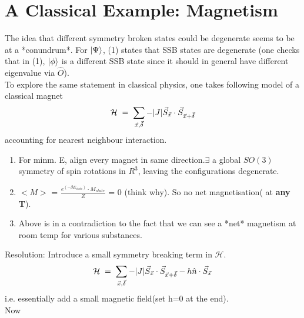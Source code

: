 \documentclass[12pt]{article}
\begin{document}
\section{A Classical Example: Magnetism}
The idea that different symmetry broken states could be degenerate seems to be at a *conundrum*. For $\ket{\Psi}$, (1) states that SSB states are degenerate (one checks that in (1), $\ket{\phi}$ is a different SSB state since it should in general have different eigenvalue via $\hat{O}$).\\
To explore the same statement in classical physics, one takes following model of a classical magnet
\begin{align}
    \mathcal{H}\;=\;\sum_{\Vec{x},\Vec{\delta}} - \abs{J} \Vec{S}_{\Vec{x}}\cdot\Vec{S}_{\Vec{x }+\Vec{\delta}}
\end{align}
accounting for nearest neighbour interaction.
\begin{enumerate}
    \item For minm. E, align every magnet in same direction.$\exists$ a global $SO(3)$ symmetry of spin rotations in $R^3$, leaving the configurations degenerate.
    \item $<M>$ = $\displaystyle{\frac{e^{(-\beta E_{state})}\cdot M_{state}}{Z}}$ = 0 (think why). So no net magnetisation( at \textbf{any T}).
    \item Above is in a contradiction to the fact that we can see a *net* magnetism at room temp for various substances.
\end{enumerate}
Resolution: Introduce a small symmetry breaking term in $\mathcal{H}$.
\begin{align}
    \mathcal{H}\;=\;\sum_{\Vec{x},\Vec{\delta}} - \abs{J} \Vec{S}_{\Vec{x}}\cdot\Vec{S}_{\Vec{x }+\Vec{\delta}} - h\hat{n}\cdot\Vec{S}_{\Vec{x}}
\end{align}
i.e. essentially add a small magnetic field(set h=0 at the end).\\
Now
\end{document}
